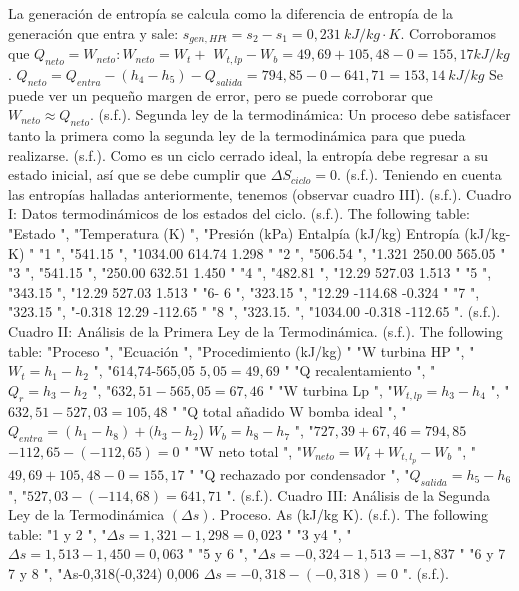 \documentclass{beamer}
\begin{document}
\begin{frame}
\begin{thebibliography}{9}
         La generación de entropía se calcula como la diferencia de entropía de la generación que entra y sale: $s_{gen,HPt}=s_{2}-s_{1}=0,231~kJ/kg\cdot K$. Corroboramos que $Q_{neto}=W_{neto}:W_{neto}=W_{t}+$ $W_{t,lp}-W_{b}=49,69+105,48-0=155,17kJ/kg$. $Q_{neto}=Q_{entra}-(h_{4}-h_{5})-Q_{salida}=794,85-0-641,71=153,14~kJ/kg$ Se puede ver un pequeño margen de error, pero se puede corroborar que $W_{neto}\approx Q_{neto}$. (s.f.). 
         Segunda ley de la termodinámica: Un proceso debe satisfacer tanto la primera como la segunda ley de la termodinámica para que pueda realizarse. (s.f.). 
         Como es un ciclo cerrado ideal, la entropía debe regresar a su estado inicial, así que se debe cumplir que $\Delta S_{ciclo}=0$. (s.f.). 
         Teniendo en cuenta las entropías halladas anteriormente, tenemos (observar cuadro III). (s.f.). 
         Cuadro I: Datos termodinámicos de los estados del ciclo. (s.f.). 
         The following table: "Estado ", "Temperatura (K) ", "Presión (kPa) Entalpía (kJ/kg) Entropía (kJ/kg-K) " "1 ", "541.15 ", "1034.00 614.74 1.298 " "2 ", "506.54 ", "1.321 250.00 565.05 " "3 ", "541.15 ", "250.00 632.51 1.450 " "4 ", "482.81 ", "12.29 527.03 1.513 " "5 ", "343.15 ", "12.29 527.03 1.513 " "6- 6 ", "323.15 ", "12.29 -114.68 -0.324 " "7 ", "323.15 ", "-0.318 12.29 -112.65 " "8 ", "323.15. ", "1034.00 -0.318 -112.65 ". (s.f.). 
         Cuadro II: Análisis de la Primera Ley de la Termodinámica. (s.f.). 
         The following table: "Proceso ", "Ecuación ", "Procedimiento (kJ/kg) " "W turbina HP ", "$W_{t}=h_{1}-h_{2}$ ", "614,74-565,05 $5,05=49,69$ " "Q recalentamiento ", "$Q_{r}=h_{3}-h_{2}$ ", "$632,51-565,05=67,46$ " "W turbina Lp ", "$W_{t,lp}=h_{3}-h_{4}$ ", "$632,51-527,03=105,48$ " "Q total añadido W bomba ideal ", "$Q_{entra}=(h_{1}-h_{8})+(h_{3}-h_{2}$) $W_{b}=h_{8}-h_{7}$ ", "$727,39+67,46=794,85$ $-112,65-(-112,65)=0$ " "W neto total ", "$W_{neto}=W_{t}+W_{t,l_{p}}-W_{b}$ ", "$49,69+105,48-0=155,17$ " "Q rechazado por condensador ", "$Q_{salida}=h_{5}-h_{6}$ ", "$527,03-(-114,68)=641,71$ ". (s.f.). 
         Cuadro III: Análisis de la Segunda Ley de la Termodinámica $(\Delta s)$. Proceso. As (kJ/kg K). (s.f.). 
         The following table: "1 y 2 ", "$\Delta s=1,321-1,298=0,023$ " "3 y4 ", "$\Delta s=1,513-1,450=0,063$ " "5 y 6 ", "$\Delta s=-0,324-1,513=-1,837$ " "6 y 7 7 y 8 ", "As-0,318(-0,324) 0,006 $\Delta s=-0,318-(-0,318)=0$ ". (s.f.). 

\end{thebibliography}
\end{frame}
\end{document}
